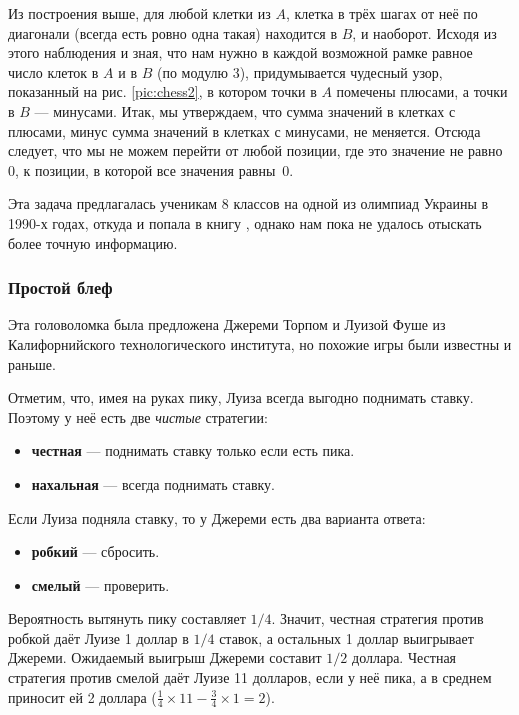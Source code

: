 Из построения выше, для любой клетки из $A$, клетка в трёх шагах от неё по диагонали (всегда есть ровно одна такая) находится в $B$, и наоборот.
Исходя из этого наблюдения и зная, что нам нужно в каждой возможной рамке равное число клеток в $A$ и в $B$ (по модулю 3), придумывается чудесный узор, показанный на рис. \ref{pic:chess2}, в котором точки в $A$ помечены плюсами, а точки в $B$ --- минусами.
Итак, мы утверждаем, что сумма значений в клетках с плюсами, минус сумма значений в клетках с минусами, не меняется.
Отсюда следует, что мы не можем перейти от любой позиции, где это значение не равно $0$, к позиции, в которой все значения равны~$0$.

\begin{addedbytheeditors}
Эта задача предлагалась ученикам 8 классов на одной из олимпиад Украины в 1990-х годах, откуда и попала в книгу \cite{markova}, однако нам пока не удалось отыскать более точную информацию.
\pr
\end{addedbytheeditors}

\subsubsection*{Простой блеф}

Эта головоломка была предложена Джереми Торпом и Луизой Фуше из Калифорнийского технологического института, но похожие игры были известны и раньше.

Отметим, что, имея на руках пику, Луиза всегда выгодно поднимать ставку.
Поэтому у неё есть две \emph{чистые} стратегии:
\begin{itemize}
 \item \textbf{честная} --- поднимать ставку только если есть пика.
 \item \textbf{нахальная} --- всегда поднимать ставку.
\end{itemize}
Если Луиза подняла ставку, то у Джереми есть два варианта ответа:
\begin{itemize}
 \item \textbf{робкий} --- сбросить.
 \item \textbf{смелый} --- проверить.
\end{itemize}

Вероятность вытянуть пику составляет $1/4$.
Значит, честная стратегия против робкой даёт Луизе 1 доллар в $1/4$ ставок, а остальных 1 доллар выигрывает Джереми.
Ожидаемый выигрыш Джереми составит $1/2$ доллара.
Честная стратегия против смелой даёт Луизе 11 долларов, если у неё пика,
а в среднем приносит ей 2 доллара ($\tfrac14 \times 11 - \tfrac 34 \times 1 = 2$).

